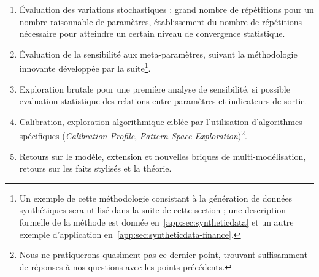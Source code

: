 {\begin{enumerate}
	\item Évaluation des variations stochastiques : grand nombre de répétitions pour un nombre raisonnable de paramètres, établissement du nombre de répétitions nécessaire pour atteindre un certain niveau de convergence statistique.
	\item Évaluation de la sensibilité aux meta-paramètres, suivant la méthodologie innovante développée par la suite\footnote{Un exemple de cette méthodologie consistant à la génération de données synthétiques sera utilisé dans la suite de cette section ; une description formelle de la méthode est donnée en~\ref{app:sec:syntheticdata} et un autre exemple d'application en~\ref{app:sec:syntheticdata-finance}.}.
	\item Exploration brutale pour une première analyse de sensibilité, si possible evaluation statistique des relations entre paramètres et indicateurs de sortie.
	\item Calibration, exploration algorithmique ciblée par l'utilisation d'algorithmes spécifiques (\emph{Calibration Profile}, \emph{Pattern Space Exploration})\footnote{Nous ne pratiquerons quasiment pas ce dernier point, trouvant suffisamment de réponses à nos questions avec les points précédents.}.
	\item Retours sur le modèle, extension et nouvelles briques de multi-modélisation, retours sur les faits stylisés et la théorie.
\end{enumerate}
}




